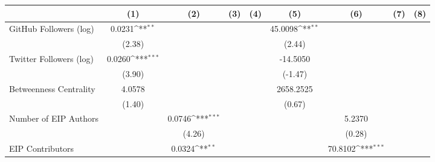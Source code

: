 {
\def\sym#1{\ifmmode^{#1}\else\(^{#1}\)\fi}
\begin{tabular}{l*{8}{c}}
\hline\hline
                                   &\multicolumn{1}{c}{(1)}         &\multicolumn{1}{c}{(2)}         &\multicolumn{1}{c}{(3)}         &\multicolumn{1}{c}{(4)}         &\multicolumn{1}{c}{(5)}         &\multicolumn{1}{c}{(6)}         &\multicolumn{1}{c}{(7)}         &\multicolumn{1}{c}{(8)}         \\
\hline
GitHub Followers (log)             &    0.0231\sym{**} &                   &                   &                   &   45.0098\sym{**} &                   &                   &                   \\
                                   &    (2.38)         &                   &                   &                   &    (2.44)         &                   &                   &                   \\
[1em]
Twitter Followers (log)            &    0.0260\sym{***}&                   &                   &                   &  -14.5050         &                   &                   &                   \\
                                   &    (3.90)         &                   &                   &                   &   (-1.47)         &                   &                   &                   \\
[1em]
Betweenness Centrality             &    4.0578         &                   &                   &                   & 2658.2525         &                   &                   &                   \\
                                   &    (1.40)         &                   &                   &                   &    (0.67)         &                   &                   &                   \\
[1em]
Number of EIP Authors              &                   &    0.0746\sym{***}&                   &                   &                   &    5.2370         &                   &                   \\
                                   &                   &    (4.26)         &                   &                   &                   &    (0.28)         &                   &                   \\
[1em]
EIP Contributors                   &                   &    0.0324\sym{**} &                   &                   &                   &   70.8102\sym{***}&                   &                   \\

\end{tabular}}
